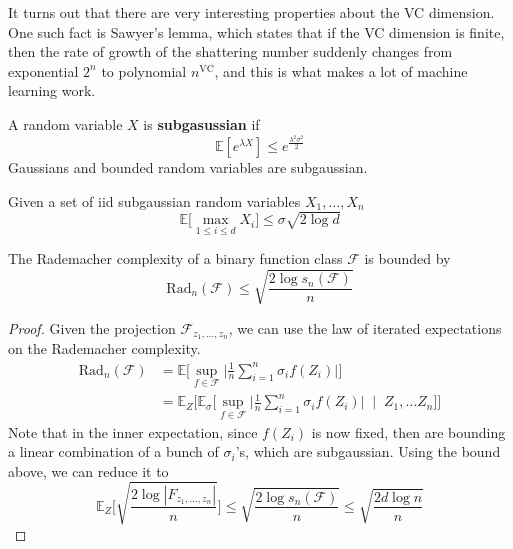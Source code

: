\documentclass{article}
\begin{document}
    It turns out that there are very interesting properties about the VC dimension. One such fact is Sawyer's lemma, which states that if the VC dimension is finite, then the rate of growth of the shattering number suddenly changes from exponential $2^n$ to polynomial $n^{\mathrm{VC}}$, and this is what makes a lot of machine learning work. 

    \begin{definition}
      A random variable $X$ is \textbf{subgasussian} if 
      \begin{equation}
        \mathbb{E}[e^{\lambda X}] \leq e^{\frac{\lambda^2 \sigma^2}{2}}
      \end{equation}
      Gaussians and bounded random variables are subgaussian.
    \end{definition}

    \begin{lemma}
      Given a set of iid subgaussian random variables $X_1, \ldots, X_n$ 
      \begin{equation}
        \mathbb{E}\big[ \max_{1 \leq i \leq d} X_i \big] \leq \sigma \sqrt{2 \log d}
      \end{equation}
    \end{lemma}

    \begin{theorem}
      The Rademacher complexity of a binary function class $\mathcal{F}$ is bounded by 
      \begin{equation}
        \mathrm{Rad}_n (\mathcal{F}) \leq \sqrt{\frac{2 \log s_n (\mathcal{F})}{n}}
      \end{equation}
    \end{theorem}
    \begin{proof}
      Given the projection $\mathcal{F}_{z_1, \ldots, z_n}$, we can use the law of iterated expectations on the Rademacher complexity. 
      \begin{align}
        \mathrm{Rad}_n (\mathcal{F}) & = \mathbb{E} \bigg[ \sup_{f \in \mathcal{F}} \bigg| \frac{1}{n} \sum_{i=1}^n \sigma_i f(Z_i) \bigg| \bigg] \\
                                     & = \mathbb{E}_{Z} \bigg[ \mathbb{E}_{\sigma} \bigg[ \sup_{f \in \mathcal{F}} \bigg| \frac{1}{n} \sum_{i=1}^n \sigma_i f(Z_i) \bigg| \; \mid \; Z_1, \ldots Z_n \bigg] \bigg] 
      \end{align}
      Note that in the inner expectation, since $f(Z_i)$ is now fixed, then are bounding a linear combination of a bunch of $\sigma_i$'s, which are subgaussian. Using the bound above, we can reduce it to 
      \begin{equation}
        \mathbb{E}_{Z} \bigg[ \sqrt{\frac{2 \log |F_{z_1, \ldots, z_n}|}{n}}\bigg] \leq \sqrt{\frac{2 \log s_n (\mathcal{F})}{n}} \leq \sqrt{\frac{2 d \log n}{n}} 
      \end{equation}
    \end{proof}
\end{document}
